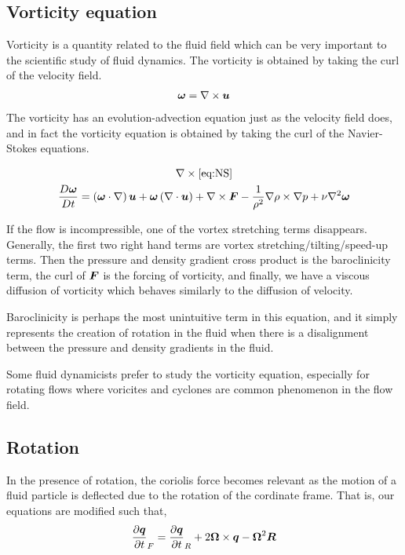 \documentclass{article}
\begin{document}
\subsection{Vorticity equation}

Vorticity is a quantity related to the fluid field which can be very important
to the scientific study of fluid dynamics. The vorticity is obtained by taking
the curl of the velocity field. 
\begin{gather*}
    \boldsymbol{\omega} = \nabla \times \boldsymbol{u}
\end{gather*}
The vorticity has an evolution-advection equation just as the velocity field
does, and in fact the vorticity equation is obtained by taking the curl of the
Navier-Stokes equations.

\begin{gather*}
    \nabla\times\eqref{eq:NS}\\
    \frac{D \boldsymbol{\omega}}{D t} =  \left(\boldsymbol{\omega}\cdot\nabla\right)\boldsymbol{u} +
    \boldsymbol{\omega}\left(\nabla\cdot\boldsymbol{u}\right) + \nabla\times\boldsymbol{F} -
    \frac{1}{\rho^2}\nabla\rho\times\nabla p + 
    \nu\nabla^2\boldsymbol{\omega} 
\end{gather*}

If the flow is incompressible, one of the vortex stretching terms disappears.
Generally, the first two right hand terms are vortex stretching/tilting/speed-up
terms. Then the pressure and density gradient cross product is the baroclinicity
term, the curl of $\boldsymbol{F}$ is the forcing of vorticity, and finally, we have a
viscous diffusion of vorticity which behaves similarly to the diffusion of
velocity. 


Baroclinicity is perhaps the most unintuitive term in this equation, and it
simply represents the creation of rotation in the fluid when there is a
disalignment between the pressure and density gradients in the fluid. 

Some fluid dynamicists prefer to study the vorticity equation, especially for
rotating flows where voricites and cyclones are common phenomenon in the flow
field. 

\subsection{Rotation}

In the presence of rotation, the coriolis force becomes relevant as the motion
of a fluid particle is deflected due to the rotation of the cordinate frame.
That is, our equations are modified such that, 
\begin{gather*}
    \frac{\partial \boldsymbol{q}}{\partial t}_F = \frac{\partial \boldsymbol{q}}{\partial t}_R + 2\boldsymbol{\Omega}\times \boldsymbol{q} -
    \boldsymbol{\Omega}^2\boldsymbol{R}
\end{gather*}
\end{document}
